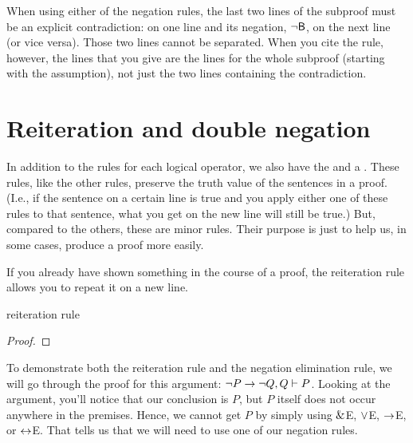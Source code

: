 When using either of the negation rules, the last two lines of the subproof must be an explicit contradiction:  on one line and its negation, ${\neg}\mathsf{B}$, on the next line (or vice versa). Those two lines cannot be separated. When you cite the rule, however, the lines that you give are the lines for the whole subproof (starting with the assumption), not just the two lines containing the contradiction. 



\section{Reiteration and double negation}
In addition to the rules for each logical operator, we also have the  and a . These rules, like the other rules, preserve the truth value of the sentences in a proof. (I.e., if the sentence on a certain line is true and you apply either one of these rules to that sentence, what you get on the new line will still be true.) But, compared to the others, these are minor rules. Their purpose is just to help us, in some cases, produce a proof more easily. 

 If you already have shown something in the course of a proof, the reiteration rule allows you to repeat it on a new line.  

\begin{factboxy}{reiteration rule}
\begin{proof}
	 
\end{proof}
\end{factboxy}

To demonstrate both the reiteration rule and the negation elimination rule, we will go through the proof for this argument: ${\neg} P \rightarrow {\neg} Q, Q \vdash P$. Looking at the argument, you'll notice that our conclusion is $P$, but $P$ itself does not occur anywhere in the premises. Hence, we cannot get $P$ by simply using $\mathbin{\&}$E, $\vee$E, $\rightarrow$E, or $\leftrightarrow$E. That tells us that we will need to use one of our negation rules.

